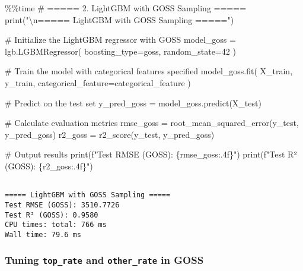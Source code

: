 \documentclass[
  letterpaper,
  DIV=11,
  numbers=noendperiod]{scrreprt}
\newenvironment{Shaded}{\begin{snugshade}}{\end{snugshade}}
\newcommand{\BuiltInTok}[1]{\textcolor[rgb]{0.00,0.23,0.31}{#1}}
\newcommand{\CharTok}[1]{\textcolor[rgb]{0.13,0.47,0.30}{#1}}
\newcommand{\CommentTok}[1]{\textcolor[rgb]{0.37,0.37,0.37}{#1}}
\newcommand{\DecValTok}[1]{\textcolor[rgb]{0.68,0.00,0.00}{#1}}
\newcommand{\NormalTok}[1]{\textcolor[rgb]{0.00,0.23,0.31}{#1}}
\newcommand{\OperatorTok}[1]{\textcolor[rgb]{0.37,0.37,0.37}{#1}}
\newcommand{\SpecialCharTok}[1]{\textcolor[rgb]{0.37,0.37,0.37}{#1}}
\newcommand{\SpecialStringTok}[1]{\textcolor[rgb]{0.13,0.47,0.30}{#1}}
\newcommand{\StringTok}[1]{\textcolor[rgb]{0.13,0.47,0.30}{#1}}
\begin{document}
\begin{Shaded}
\begin{Highlighting}[]
\OperatorTok{\%\%}\NormalTok{time}
\CommentTok{\# ===== 2. LightGBM with GOSS Sampling =====}
\BuiltInTok{print}\NormalTok{(}\StringTok{"}\CharTok{\textbackslash{}n}\StringTok{===== LightGBM with GOSS Sampling ====="}\NormalTok{)}

\CommentTok{\# Initialize the LightGBM regressor with GOSS}
\NormalTok{model\_goss }\OperatorTok{=}\NormalTok{ lgb.LGBMRegressor(}
\NormalTok{    boosting\_type}\OperatorTok{=}\StringTok{\textquotesingle{}goss\textquotesingle{}}\NormalTok{,}
\NormalTok{    random\_state}\OperatorTok{=}\DecValTok{42}
\NormalTok{)}

\CommentTok{\# Train the model with categorical features specified}
\NormalTok{model\_goss.fit(}
\NormalTok{    X\_train,}
\NormalTok{    y\_train,}
\NormalTok{    categorical\_feature}\OperatorTok{=}\NormalTok{categorical\_feature}
\NormalTok{)}

\CommentTok{\# Predict on the test set}
\NormalTok{y\_pred\_goss }\OperatorTok{=}\NormalTok{ model\_goss.predict(X\_test)}

\CommentTok{\# Calculate evaluation metrics}
\NormalTok{rmse\_goss }\OperatorTok{=}\NormalTok{ root\_mean\_squared\_error(y\_test, y\_pred\_goss)}
\NormalTok{r2\_goss }\OperatorTok{=}\NormalTok{ r2\_score(y\_test, y\_pred\_goss)}

\CommentTok{\# Output results}
\BuiltInTok{print}\NormalTok{(}\SpecialStringTok{f"Test RMSE (GOSS): }\SpecialCharTok{\{}\NormalTok{rmse\_goss}\SpecialCharTok{:.4f\}}\SpecialStringTok{"}\NormalTok{)}
\BuiltInTok{print}\NormalTok{(}\SpecialStringTok{f"Test R² (GOSS): }\SpecialCharTok{\{}\NormalTok{r2\_goss}\SpecialCharTok{:.4f\}}\SpecialStringTok{"}\NormalTok{)}
\end{Highlighting}
\end{Shaded}

\begin{verbatim}

===== LightGBM with GOSS Sampling =====
Test RMSE (GOSS): 3510.7726
Test R² (GOSS): 0.9580
CPU times: total: 766 ms
Wall time: 79.6 ms
\end{verbatim}

\subsubsection{\texorpdfstring{Tuning \texttt{top\_rate} and
\texttt{other\_rate} in
GOSS}{Tuning top\_rate and other\_rate in GOSS}}\label{tuning-top_rate-and-other_rate-in-goss}
\end{document}
